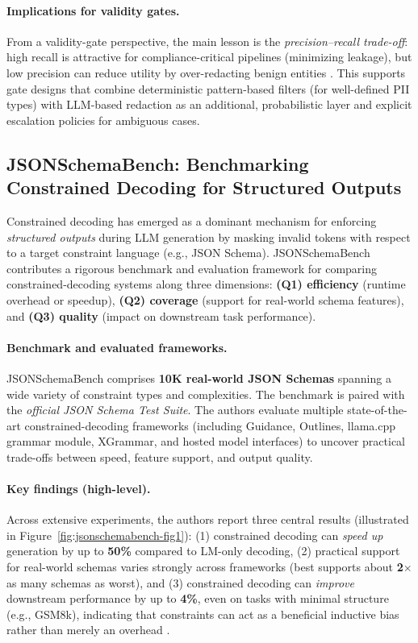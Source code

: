 \paragraph{Implications for validity gates.}
From a validity-gate perspective, the main lesson is the \emph{precision--recall trade-off}:
high recall is attractive for compliance-critical pipelines (minimizing leakage), but low precision can reduce utility
by over-redacting benign entities \cite{singhal2024deid_gpt4}. This supports gate designs that combine deterministic pattern-based
filters (for well-defined PII types) with LLM-based redaction as an additional, probabilistic layer and explicit escalation policies
for ambiguous cases.

\subsection{JSONSchemaBench: Benchmarking Constrained Decoding for Structured Outputs}
\label{subsec:jsonschemabench}

Constrained decoding has emerged as a dominant mechanism for enforcing \emph{structured outputs} during LLM generation by masking invalid tokens with respect to a target constraint language (e.g., JSON Schema). JSONSchemaBench \cite{geng2025jsonschemabench} contributes a rigorous benchmark and evaluation framework for comparing constrained-decoding systems along three dimensions:
\textbf{(Q1) efficiency} (runtime overhead or speedup), \textbf{(Q2) coverage} (support for real-world schema features), and \textbf{(Q3) quality} (impact on downstream task performance).

\paragraph{Benchmark and evaluated frameworks.}
JSONSchemaBench \cite{geng2025jsonschemabench} comprises \textbf{10K real-world JSON Schemas} spanning a wide variety of constraint types and complexities. The benchmark is paired with the \emph{official JSON Schema Test Suite}. The authors evaluate multiple state-of-the-art constrained-decoding frameworks (including Guidance, Outlines, llama.cpp grammar module, XGrammar, and hosted model interfaces) to uncover practical trade-offs between speed, feature support, and output quality.

\paragraph{Key findings (high-level).}
Across extensive experiments, the authors report three central results (illustrated in Figure~\ref{fig:jsonschemabench-fig1}):
(1) constrained decoding can \emph{speed up} generation by up to \textbf{50\%} compared to LM-only decoding,
(2) practical support for real-world schemas varies strongly across frameworks (best supports about \textbf{2$\times$} as many schemas as worst),
and (3) constrained decoding can \emph{improve} downstream performance by up to \textbf{4\%}, even on tasks with minimal structure (e.g., GSM8k), indicating that constraints can act as a beneficial inductive bias rather than merely an overhead \cite{geng2025jsonschemabench}.

